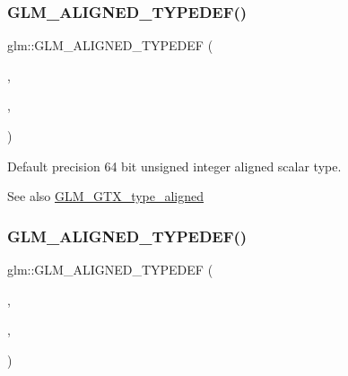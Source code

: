 \subsubsection{\texorpdfstring{G\+L\+M\+\_\+\+A\+L\+I\+G\+N\+E\+D\+\_\+\+T\+Y\+P\+E\+D\+E\+F()}{GLM\_ALIGNED\_TYPEDEF()}\hspace{0.1cm}{\footnotesize\ttfamily [112/209]}}
{\footnotesize\ttfamily glm\+::\+G\+L\+M\+\_\+\+A\+L\+I\+G\+N\+E\+D\+\_\+\+T\+Y\+P\+E\+D\+EF (\begin{DoxyParamCaption}\item[{\hyperlink{group__gtc__type__precision_ga058f57c19e1befdcf12498944bd73e69}{uint64\+\_\+t}}]{,  }\item[{aligned\+\_\+uint64\+\_\+t}]{,  }\item[{8}]{ }\end{DoxyParamCaption})}

Default precision 64 bit unsigned integer aligned scalar type. \begin{DoxySeeAlso}{See also}
\hyperlink{group__gtx__type__aligned}{G\+L\+M\+\_\+\+G\+T\+X\+\_\+type\+\_\+aligned} 
\end{DoxySeeAlso}
\mbox{\label{group__gtx__type__aligned_ga4f3bab577daf3343e99cc005134bce86}} 
\subsubsection{\texorpdfstring{G\+L\+M\+\_\+\+A\+L\+I\+G\+N\+E\+D\+\_\+\+T\+Y\+P\+E\+D\+E\+F()}{GLM\_ALIGNED\_TYPEDEF()}\hspace{0.1cm}{\footnotesize\ttfamily [113/209]}}
{\footnotesize\ttfamily glm\+::\+G\+L\+M\+\_\+\+A\+L\+I\+G\+N\+E\+D\+\_\+\+T\+Y\+P\+E\+D\+EF (\begin{DoxyParamCaption}\item[{\hyperlink{group__gtc__type__precision_ga5e3dc67373d5068997d2d9f41c9024d2}{u8}}]{,  }\item[{aligned\+\_\+u8}]{,  }\item[{1}]{ }\end{DoxyParamCaption})}

